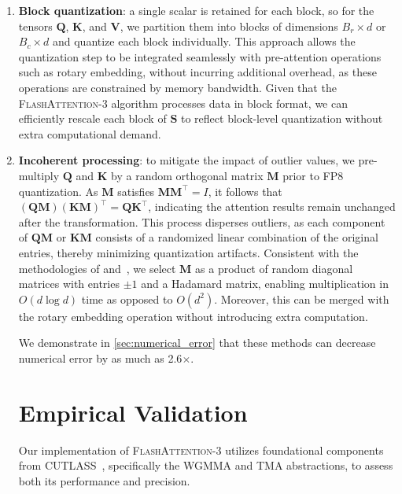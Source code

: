 \begin{enumerate}

\item \textbf{Block quantization}: a single scalar is retained for each block, so for the tensors $\mathbf{Q}$, $\mathbf{K}$, and $\mathbf{V}$, we partition them into blocks of dimensions $B_r \times d$ or $B_c \times d$ and quantize each block individually. This approach allows the quantization step to be integrated seamlessly with pre-attention operations such as rotary embedding, without incurring additional overhead, as these operations are constrained by memory bandwidth. Given that the \textsc{FlashAttention-3} algorithm processes data in block format, we can efficiently rescale each block of $\mathbf{S}$ to reflect block-level quantization without extra computational demand.

\item \textbf{Incoherent processing}: to mitigate the impact of outlier values, we pre-multiply $\mathbf{Q}$ and $\mathbf{K}$ by a random orthogonal matrix $\mathbf{M}$ prior to FP8 quantization. As $\mathbf{M}$ satisfies $\mathbf{M} \mathbf{M}^\top = I$, it follows that $(\mathbf{Q} \mathbf{M}) (\mathbf{K} \mathbf{M})^\top = \mathbf{Q} \mathbf{K}^\top$, indicating the attention results remain unchanged after the transformation. This process disperses outliers, as each component of $\mathbf{Q} \mathbf{M}$ or $\mathbf{K} \mathbf{M}$ consists of a randomized linear combination of the original entries, thereby minimizing quantization artifacts. Consistent with the methodologies of \citet{chee2024quip} and~\citet{tseng2024quip}, we select $\mathbf{M}$ as a product of random diagonal matrices with entries $\pm 1$ and a Hadamard matrix, enabling multiplication in $O(d \log d)$ time as opposed to $O(d^2)$. Moreover, this can be merged with the rotary embedding operation without introducing extra computation.

We demonstrate in \cref{sec:numerical_error} that these methods can decrease numerical error by as much as 2.6$\times$.

\section{Empirical Validation}
\label{sec:exp}

Our implementation of \textsc{FlashAttention-3} utilizes foundational components from CUTLASS~\citep{Thakkar_CUTLASS_2023}, specifically the WGMMA and TMA abstractions, to assess both its performance and precision.


\end{enumerate}

